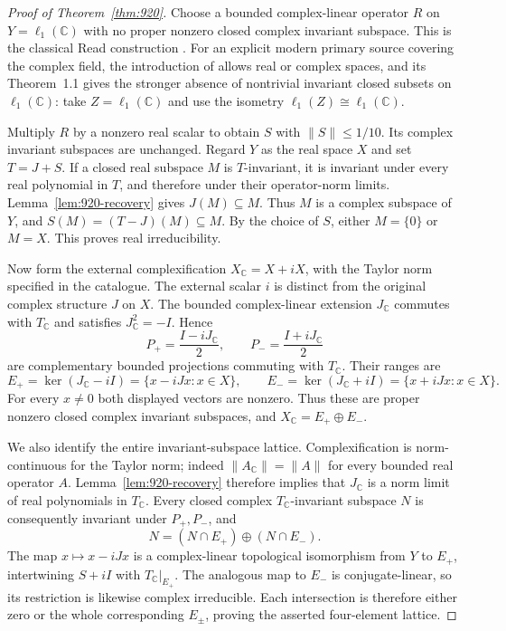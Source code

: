 \documentclass[11pt,a4paper]{article}
\theoremstyle{remark}
\begin{document}
\begin{proof}[Proof of Theorem~\ref{thm:920}]
Choose a bounded complex-linear operator $R$ on $Y=\ell_1(\mathbb C)$
with no proper nonzero closed complex invariant subspace.  This is the
classical Read construction \cite{Read1986}.  For an explicit modern
primary source covering the complex field, the introduction of
\cite{GR2014} allows real or complex spaces, and its Theorem~1.1 gives
the stronger absence of nontrivial invariant closed subsets on
$\ell_1(\mathbb C)$: take $Z=\ell_1(\mathbb C)$ and use the isometry
$\ell_1(Z)\cong\ell_1(\mathbb C)$.

Multiply $R$ by a nonzero real scalar to obtain $S$ with
$\|S\|\leq1/10$.  Its complex invariant subspaces are unchanged.
Regard $Y$ as the real space $X$ and set $T=J+S$.
If a closed real subspace $M$ is $T$-invariant, it is invariant under
every real polynomial in $T$, and therefore under their operator-norm
limits.  Lemma~\ref{lem:920-recovery} gives $J(M)\subseteq M$.
Thus $M$ is a complex subspace of $Y$, and
$S(M)=(T-J)(M)\subseteq M$.  By the choice of $S$, either $M=\{0\}$
or $M=X$.  This proves real irreducibility.

Now form the external complexification $X_{\mathbb C}=X+iX$, with
the Taylor norm specified in the catalogue.  The external scalar $i$
is distinct from the original complex structure $J$ on $X$.
The bounded complex-linear extension $J_{\mathbb C}$ commutes with
$T_{\mathbb C}$ and satisfies $J_{\mathbb C}^2=-I$.  Hence
\[
 P_+=\frac{I-iJ_{\mathbb C}}2,\qquad
 P_-=\frac{I+iJ_{\mathbb C}}2
\]
are complementary bounded projections commuting with $T_{\mathbb C}$.
Their ranges are
\[
 E_+=\ker(J_{\mathbb C}-iI)
       =\{x-iJx:x\in X\},\qquad
 E_-=\ker(J_{\mathbb C}+iI)
       =\{x+iJx:x\in X\}.
\]
For every $x\ne0$ both displayed vectors are nonzero.  Thus these are
proper nonzero closed complex invariant subspaces, and
$X_{\mathbb C}=E_+\oplus E_-$.

We also identify the entire invariant-subspace lattice.
Complexification is norm-continuous for the Taylor norm; indeed
$\|A_{\mathbb C}\|=\|A\|$ for every bounded real operator $A$.
Lemma~\ref{lem:920-recovery} therefore implies that
$J_{\mathbb C}$ is a norm limit of real polynomials in $T_{\mathbb C}$.
Every closed complex $T_{\mathbb C}$-invariant subspace $N$ is consequently
invariant under $P_+,P_-$, and
\[
 N=(N\cap E_+)\oplus(N\cap E_-).
\]
The map $x\mapsto x-iJx$ is a complex-linear topological isomorphism
from $Y$ to $E_+$, intertwining $S+iI$ with
$T_{\mathbb C}|_{E_+}$.  The analogous map to $E_-$ is conjugate-linear,
so its restriction is likewise complex irreducible.  Each intersection
is therefore either zero or the whole corresponding $E_\pm$, proving
the asserted four-element lattice.


\end{proof}
\end{document}
